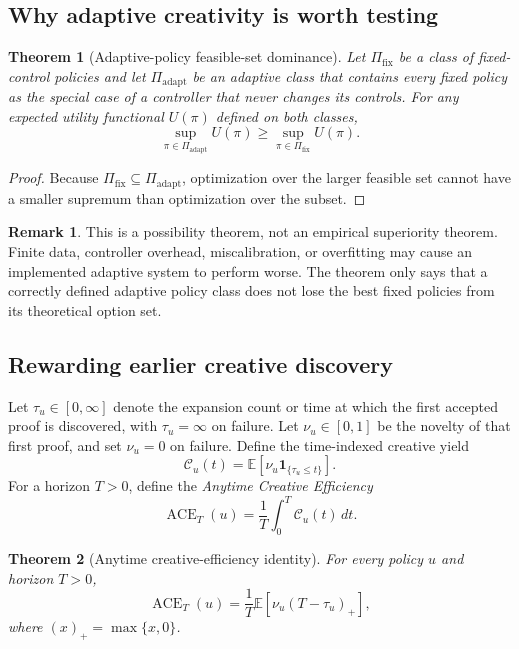 \documentclass[11pt]{article}
\theoremstyle{datatheorem}
\newtheorem{theorem}{Theorem}[section]
\theoremstyle{definition}
\newtheorem{remark}{Remark}[section]
\newcommand{\E}{\mathbb{E}}
\newcommand{\ind}{\mathbf{1}}
\newcommand{\cY}{\mathcal{C}}
\newcommand{\PiFix}{\Pi_{\mathrm{fix}}}
\newcommand{\PiAd}{\Pi_{\mathrm{adapt}}}
\begin{document}
\subsection{Why adaptive creativity is worth testing}

\begin{theorem}[Adaptive-policy feasible-set dominance]\label{thm:adaptive}
Let $\PiFix$ be a class of fixed-control policies and let $\PiAd$ be an adaptive class that contains every fixed policy as the special case of a controller that never changes its controls. For any expected utility functional $U(\pi)$ defined on both classes,
\[
\sup_{\pi\in\PiAd}U(\pi)
\ge
\sup_{\pi\in\PiFix}U(\pi).
\]
\end{theorem}

\begin{proof}
Because $\PiFix\subseteq\PiAd$, optimization over the larger feasible set cannot have a smaller supremum than optimization over the subset.
\end{proof}

\begin{remark}
This is a possibility theorem, not an empirical superiority theorem. Finite data, controller overhead, miscalibration, or overfitting may cause an implemented adaptive system to perform worse. The theorem only says that a correctly defined adaptive policy class does not lose the best fixed policies from its theoretical option set.
\end{remark}

\subsection{Rewarding earlier creative discovery}

Let $\tau_u\in[0,\infty]$ denote the expansion count or time at which the first accepted proof is discovered, with $\tau_u=\infty$ on failure. Let $\nu_u\in[0,1]$ be the novelty of that first proof, and set $\nu_u=0$ on failure. Define the time-indexed creative yield
\[
\cY_u(t)=\E\left[\nu_u\ind_{\{\tau_u\le t\}}\right].
\]
For a horizon $T>0$, define the \emph{Anytime Creative Efficiency}
\[
\operatorname{ACE}_T(u)
=\frac{1}{T}\int_0^T\cY_u(t)\,dt.
\]

\begin{theorem}[Anytime creative-efficiency identity]\label{thm:ace}
For every policy $u$ and horizon $T>0$,
\[
\operatorname{ACE}_T(u)
=\frac{1}{T}\E\left[\nu_u(T-\tau_u)_+\right],
\]
where $(x)_+=\max\{x,0\}$.
\end{theorem}
\end{document}
